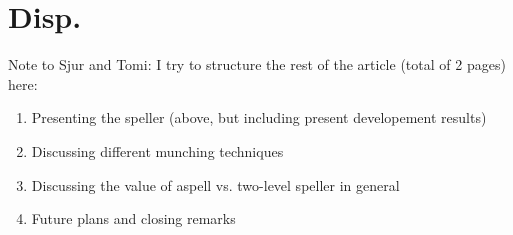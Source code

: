 \documentclass[a4paper,english]{article}
\begin{document}
\section{Disp.}

Note to Sjur and Tomi: I try to structure the rest of the article (total of 2 pages) here:

\begin{enumerate}
\item Presenting the speller (above, but including present developement results)
\item Discussing different munching techniques
\item Discussing the value of aspell vs. two-level speller in general
\item Future plans and closing remarks
\end{enumerate}
\end{document}
